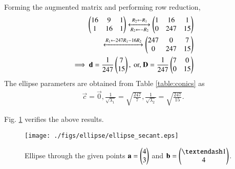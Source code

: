 \begin{enumerate}[label=\thesubsection.\arabic*.,ref=\thesubsection.\theenumi]
\begin{align}
\end{align}
Forming the augmented matrix and performing row reduction,
\begin{align}
\begin{pmatrix}16 & 9 & 1\\ 1 & 16 & 1\end{pmatrix} 
\xleftrightarrow[R_2\leftarrow -R_2]{R_2\leftarrow R_1}
\begin{pmatrix}1 & 16 & 1 \\ 0 & 247 & 15\end{pmatrix} 
\\
\xleftrightarrow[]{R_1\leftarrow 247R_1-16R_2}
\begin{pmatrix}247 & 0 & 7 \\ 0 & 247 & 15\end{pmatrix} 
\\
\implies \mathbf{d} = \frac{1}{247}\begin{pmatrix}7\\15\end{pmatrix}, \text{ or, } \mathbf{D} = \frac{1}{247}\begin{pmatrix}7 & 0 \\ 0 & 15\end{pmatrix}
\end{align}
The ellipse parameters are obtained from Table \ref{table:conics} as
\begin{align}
\vec{c} = \vec{0},
\frac{1}{\sqrt{\lambda_1}}  = \sqrt{\frac{247}{7}},
\frac{1}{\sqrt{\lambda_2}}  = \sqrt{\frac{247}{15}}.
\end{align}

Fig. \ref{fig:ellipse_secant}	verifies the above results.
\begin{figure}[!ht]
\centering
\texttt{[image: ./figs/ellipse/ellipse\_secant.eps]}
\caption{Ellipse through the given points $\mathbf{a} = \begin{pmatrix}4\\3\end{pmatrix}$  and $\vec{b} = \myvec{– 1\\4}$.}
\label{fig:ellipse_secant}	
\end{figure}


\end{enumerate}
